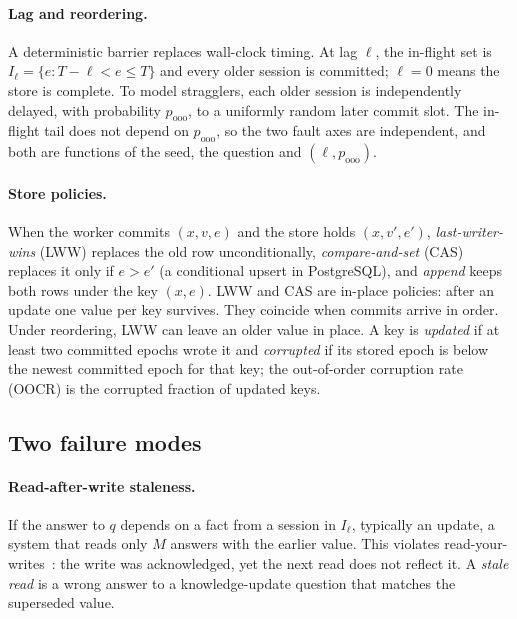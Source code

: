 \paragraph{Lag and reordering.}
A deterministic barrier replaces wall-clock timing. At lag $\ell$, the in-flight set is $I_\ell = \{e : T-\ell < e \le T\}$ and every older session is committed; $\ell=0$ means the store is complete. To model stragglers, each older session is independently delayed, with probability $p_\text{ooo}$, to a uniformly random later commit slot. The in-flight tail does not depend on $p_\text{ooo}$, so the two fault axes are independent, and both are functions of the seed, the question and $(\ell, p_\text{ooo})$.

\paragraph{Store policies.}
When the worker commits $(x, v, e)$ and the store holds $(x, v', e')$, \emph{last-writer-wins} (LWW) replaces the old row unconditionally, \emph{compare-and-set} (CAS) replaces it only if $e > e'$ (a conditional upsert in PostgreSQL), and \emph{append} keeps both rows under the key $(x, e)$. LWW and CAS are in-place policies: after an update one value per key survives. They coincide when commits arrive in order. Under reordering, LWW can leave an older value in place. A key is \emph{updated} if at least two committed epochs wrote it and \emph{corrupted} if its stored epoch is below the newest committed epoch for that key; the out-of-order corruption rate (OOCR) is the corrupted fraction of updated keys.

\subsection{Two failure modes}
\label{sec:failures}

\paragraph{Read-after-write staleness.}
If the answer to $q$ depends on a fact from a session in $I_\ell$, typically an update, a system that reads only $M$ answers with the earlier value. This violates read-your-writes~\citep{terry1994session}: the write was acknowledged, yet the next read does not reflect it. A \emph{stale read} is a wrong answer to a knowledge-update question that matches the superseded value.

